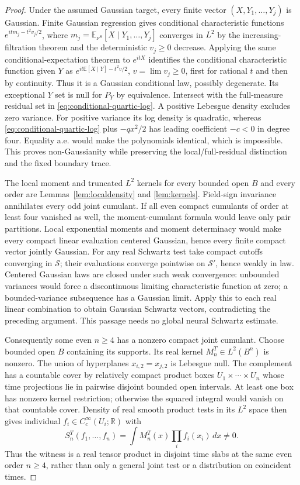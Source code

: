 \documentclass[11pt]{article}
\theoremstyle{plain}
\theoremstyle{definition}
\theoremstyle{remark}
\newcommand{\R}{\mathbb{R}}
\newcommand{\E}{\mathbb{E}}
\newcommand{\cS}{\mathcal{S}}
\begin{document}
\begin{proof}
Under the assumed Gaussian target, every finite vector $(X,Y_1,\ldots,Y_j)$
is Gaussian. Finite Gaussian regression gives conditional characteristic
functions $e^{itm_j-t^2v_j/2}$, where
$m_j=\E_{\nu^S}[X\mid Y_1,\ldots,Y_j]$ converges in $L^2$ by the
increasing-filtration theorem and the deterministic $v_j\ge0$ decrease.
Applying the same conditional-expectation theorem to $e^{itX}$ identifies
the conditional characteristic function given $Y$ as
$e^{it\E[X\mid Y]-t^2v/2}$, $v=\lim v_j\ge0$, first for rational $t$
and then by continuity. Thus it is a Gaussian conditional law, possibly
degenerate. Its exceptional $Y$ set is null for $P_Y$ by equivalence.
Intersect with the full-measure residual set in
\eqref{eq:conditional-quartic-log}. A positive Lebesgue density excludes
zero variance. For positive variance its log density is quadratic, whereas
\eqref{eq:conditional-quartic-log} plus $-qx^2/2$ has leading coefficient
$-c<0$ in degree four. Equality a.e. would make the polynomials identical,
which is impossible. This proves non-Gaussianity while preserving the
local/full-residual distinction and the fixed boundary trace.

\label{proof:CT-vi-witness}
The local moment and truncated $L^2$ kernels for every bounded open $B$
and every order are Lemmas~\ref{lem:localdensity} and \ref{lem:kernels}.
Field-sign invariance annihilates every odd joint cumulant. If all even
compact cumulants of order at least four vanished as well, the
moment-cumulant formula would leave only pair partitions. Local exponential
moments and moment determinacy would make every compact linear evaluation
centered Gaussian, hence every finite compact vector jointly Gaussian.
For any real Schwartz test take compact cutoffs converging in $\cS$;
their evaluations converge pointwise on $\cS'$, hence weakly in law.
Centered Gaussian laws are closed under such weak convergence: unbounded
variances would force a discontinuous limiting characteristic function at
zero; a bounded-variance subsequence has a Gaussian limit. Apply this to
each real linear combination to obtain Gaussian Schwartz vectors,
contradicting the preceding argument. This passage needs no global neural
Schwartz estimate.

Consequently some even $n\ge4$ has a nonzero compact joint cumulant.
Choose bounded open $B$ containing its supports. Its real kernel
$M_n^T\in L^2(B^n)$ is nonzero. The union of hyperplanes
$x_{i,2}=x_{j,2}$ is Lebesgue null. The complement has a countable cover
by relatively compact product boxes $U_1\times\cdots\times U_n$ whose
time projections lie in pairwise disjoint bounded open intervals.
At least one box has nonzero kernel restriction; otherwise the squared
integral would vanish on that countable cover. Density of real smooth
product tests in its $L^2$ space then gives individual
$f_i\in C_c^\infty(U_i;\R)$ with
\begin{equation}\label{eq:disjoint-time-witness}
 S_n^T(f_1,\ldots,f_n)=\int M_n^T(x)\prod_i f_i(x_i)\,dx\ne0.
\end{equation}
Thus the witness is a real tensor product in disjoint time slabs at the
same even order $n\ge4$, rather than only a general joint test or a
distribution on coincident times.


\end{proof}
\end{document}
